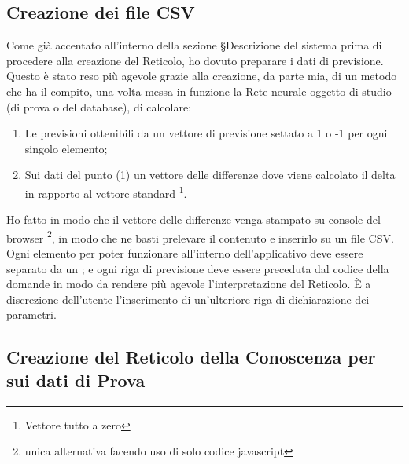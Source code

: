 \subsection{Creazione dei file CSV}
\label{Creazione dei file CSV}
Come gi\`a accentato all'interno della sezione §{Descrizione del sistema} prima di procedere alla creazione del Reticolo, ho dovuto preparare i dati di previsione. Questo \`e stato reso pi\`u agevole grazie alla creazione, da parte mia, di un metodo che ha il compito, una volta messa in funzione la Rete neurale oggetto di studio (di prova o del database), di calcolare:
\begin{enumerate}
\item Le previsioni ottenibili da un vettore di previsione settato a 1 o -1 per ogni singolo elemento;
\item Sui dati del punto (1) un vettore delle differenze dove viene calcolato il delta in rapporto al vettore standard \footnote{Vettore tutto a zero}.
\end{enumerate}
\noindent
Ho fatto in modo che il vettore delle differenze venga stampato su console del browser \footnote{unica alternativa facendo uso di solo codice javascript}, in modo che ne basti prelevare il contenuto e inserirlo su un file CSV. Ogni elemento per poter funzionare all'interno dell'applicativo deve essere separato da un ; e ogni riga di previsione deve essere preceduta dal codice della domande in modo da rendere pi\`u agevole l'interpretazione del Reticolo. \`E a discrezione dell'utente l'inserimento di un'ulteriore riga di dichiarazione dei parametri.

\subsection{Creazione del Reticolo della Conoscenza per sui dati di Prova}
\label{Creazione del Reticolo della Conoscenza per sui dati di Prova}

